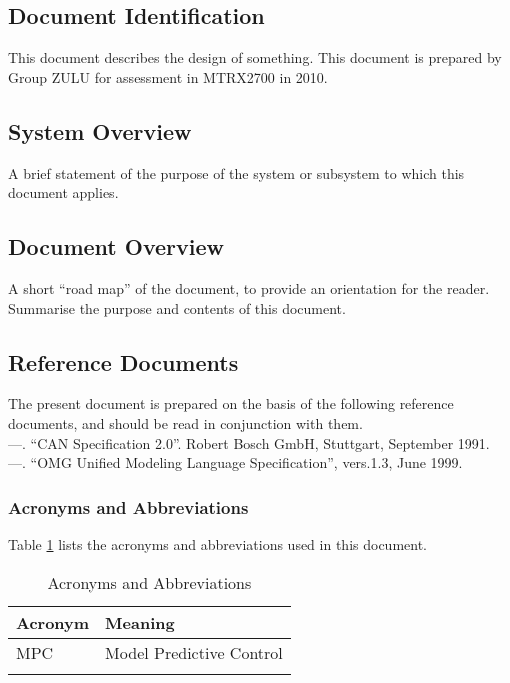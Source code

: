 \documentclass[MTRX3700report.tex]{subfiles}
\begin{document}
\subsection{Document Identification}
This document describes the design of something. This document is prepared by Group ZULU for assessment in MTRX2700 in 2010.
\subsection{System Overview}
A brief statement of the purpose of the system or subsystem to which this document applies.
\subsection{Document Overview}
A short “road map” of the document, to provide an orientation for the reader. Summarise the purpose and contents of this document.
\subsection{Reference Documents}
The present document is prepared on the basis of the following reference documents, and should be read in conjunction with them.\\
—.  “CAN Specification 2.0”.  Robert Bosch GmbH, Stuttgart, September 1991.\\
—.  “OMG Unified Modeling Language Specification”, vers.1.3, June 1999.

\subsubsection{Acronyms and Abbreviations}
Table \ref{Acro} lists the acronyms and abbreviations used in this document.
\begin{table}[h]
\centering
\caption{Acronyms and Abbreviations}
\label{Acro}
\begin{tabular}{|l|l|}
\hline Acronym & Meaning \\
\hline MPC & Model Predictive Control \\
\hline & \\
\hline
\end{tabular}
\end{table}
\end{document}
